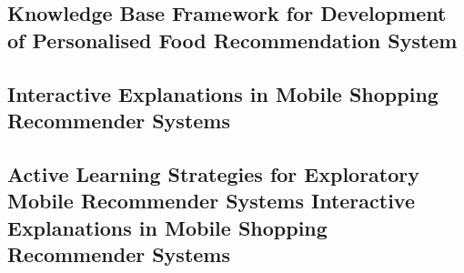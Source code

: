 \subsection{Knowledge Base Framework for Development of Personalised Food Recommendation System}

\subsection{Interactive Explanations in Mobile Shopping Recommender Systems}

\subsection{Active Learning Strategies for Exploratory Mobile Recommender Systems Interactive Explanations in Mobile Shopping Recommender Systems}